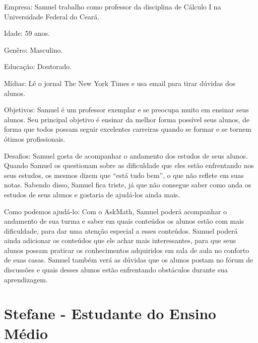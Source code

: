 Empresa: Samuel trabalho como professor da disciplina de C\'alculo I na
Universidade Federal do Ceará.

Idade: 59 anos.

Genêro: Masculino.

Educação: Doutorado.

Mídias: Lê o jornal The New York Times e usa email para tirar dúvidas dos alunos.

Objetivos: Samuel é um professor exemplar e se preocupa muito em ensinar seus 
alunos. Seu principal objetivo é ensinar da melhor forma possível seus alunos, 
de forma que todos possam seguir excelentes carreiras quando se formar e se 
tornem ótimos profissionais.

Desafios: Samuel gosta de acompanhar o andamento dos estudos de seus alunos. Quando Samuel os questionam sobre as dificuldade que eles est\~ao enfrentando nos seus estudos, os mesmos dizem que ``está 
tudo bem'', o que não reflete em suas notas. Sabendo disso, Samuel fica triste, já que não consegue saber como anda os estudos de seus alunos e gostaria de ajudá-los ainda mais.

Como podemos ajudá-lo: Com o AskMath, Samuel poder\'a acompanhar o andamento de sua turma e saber em quais conteúdos os alunos est\~ao com mais dificuldade, para dar uma aten\c{c}\~ao especial a 
esses conte\'udos. Samuel poderá ainda adicionar os conteúdos que ele achar mais interessantes, para que seus alunos possam praticar os conhecimentos adquiridos em sala de aula no conforto de suas 
casas. Samuel tamb\'em ver\'a as dúvidas que os alunos postam no fórum de discuss\~oes e quais desses alunos est\~ao enfrentando obstáculos durante sua aprendizagem.

\section{Stefane - Estudante do Ensino Médio}

\begin{figure}[h!]
  \centering
\end{figure}



